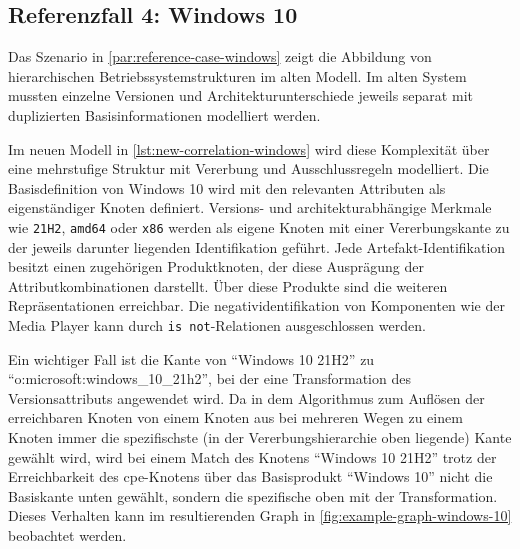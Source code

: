 \subsection{Referenzfall 4: Windows 10}\label{subsec:example-windows}

Das Szenario in \autoref{par:reference-case-windows} zeigt die Abbildung von hierarchischen Betriebssystemstrukturen im alten Modell.
Im alten System mussten einzelne Versionen und Architekturunterschiede jeweils separat mit duplizierten Basisinformationen modelliert werden.

Im neuen Modell in \autoref{lst:new-correlation-windows} wird diese Komplexität über eine mehrstufige Struktur mit Vererbung und Ausschlussregeln modelliert.
Die Basisdefinition von Windows 10 wird mit den relevanten Attributen als eigenständiger Knoten definiert.
Versions- und architekturabhängige Merkmale wie \texttt{21H2}, \texttt{amd64} oder \texttt{x86} werden als eigene Knoten mit einer Vererbungskante zu der jeweils darunter liegenden Identifikation geführt.
Jede Artefakt-Identifikation besitzt einen zugehörigen Produktknoten, der diese Ausprägung der Attributkombinationen darstellt.
Über diese Produkte sind die weiteren Repräsentationen erreichbar.
Die negatividentifikation von Komponenten wie der Media Player kann durch \texttt{is not}-Relationen ausgeschlossen werden.

Ein wichtiger Fall ist die Kante von \enquote{Windows 10 21H2} zu \enquote{o:microsoft:windows\_10\_21h2}, bei der eine Transformation des Versionsattributs angewendet wird.
Da in dem Algorithmus zum Auflösen der erreichbaren Knoten von einem Knoten aus bei mehreren Wegen zu einem Knoten immer die spezifischste (in der Vererbungshierarchie oben liegende) Kante gewählt wird, wird bei einem Match des Knotens \enquote{Windows 10 21H2} trotz der Erreichbarkeit des \acrshort{cpe}-Knotens über das Basisprodukt \enquote{Windows 10} nicht die Basiskante unten gewählt, sondern die spezifische oben mit der Transformation.
Dieses Verhalten kann im resultierenden Graph in \autoref{fig:example-graph-windows-10} beobachtet werden.

